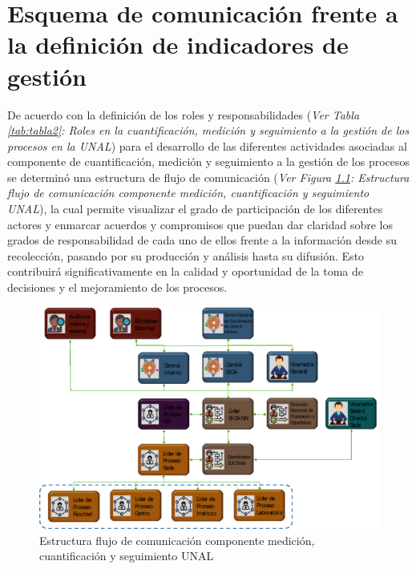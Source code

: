 \documentclass[
]{book}
\begin{document}
\hypertarget{esquema-de-comunicaciuxf3n-frente-a-la-definiciuxf3n-de-indicadores-de-gestiuxf3n}{%
\chapter{Esquema de comunicación frente a la definición de indicadores de gestión}\label{esquema-de-comunicaciuxf3n-frente-a-la-definiciuxf3n-de-indicadores-de-gestiuxf3n}}

De acuerdo con la definición de los roles y responsabilidades (\emph{Ver Tabla \ref{tab:tabla2}: Roles en la cuantificación, medición y seguimiento a la gestión de los procesos en la UNAL}) para el desarrollo de las diferentes actividades asociadas al componente de cuantificación, medición y seguimiento a la gestión de los procesos se determinó una estructura de flujo de comunicación (\emph{Ver Figura \ref{fig:figura22}: Estructura flujo de comunicación componente medición, cuantificación y seguimiento UNAL}), la cual permite visualizar el grado de participación de los diferentes actores y enmarcar acuerdos y compromisos que puedan dar claridad sobre los grados de responsabilidad de cada uno de ellos frente a la información desde su recolección, pasando por su producción y análisis hasta su difusión. Esto contribuirá significativamente en la calidad y oportunidad de la toma de decisiones y el mejoramiento de los procesos.

\begin{figure}

{\centering \includegraphics[width=0.8\linewidth]{Imagenes/figura_22} 

}

\caption{Estructura flujo de comunicación componente medición, cuantificación y seguimiento UNAL}\label{fig:figura22}
\end{figure}
\end{document}

